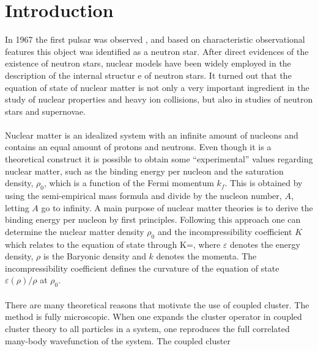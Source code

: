 \chapter{Introduction}
In 1967 the first
pulsar was observed \cite{nat:hewish}, and based on characteristic
observational features this object was identified as a neutron star. After
direct evidences of the existence of neutron stars, nuclear models have been widely
employed in the description of the internal structur e of neutron stars. It 
turned out that the equation of state of nuclear matter is not only a very 
important ingredient in the study of nuclear properties and heavy ion 
collisions, but also in studies of neutron stars and supernovae.\\
\\
Nuclear matter is an idealized system with an infinite amount of nucleons
and contains an equal amount of protons and neutrons. Even though it is a
theoretical construct it is possible to obtain some ``experimental'' values
regarding nuclear matter, such as the binding energy per nucleon and the saturation density, $\rho_0$, which
is a function of the Fermi momentum $k_f$. 
This is obtained by using the semi-empirical mass formula and divide
by the nucleon number, $A$, letting
$A$ go to infinity. A main purpose of nuclear matter theories is to derive the 
binding energy per nucleon by first principles. Following this approach one can determine the nuclear matter density $\rho_0$ and the incompressibility coefficient $K$ which relates to the equation of state through
\beq
K=,
\eeq
where $\varepsilon$ denotes the energy density, $\rho$ is the Baryonic density 
and $k$ denotes the momenta. The incompressibility coefficient defines the 
curvature of the equation of state $\varepsilon(\rho)/\rho$ at $\rho_0$.\\ 
\\
There are many theoretical reasons that motivate the use of coupled cluster. The
method is fully microscopic. When one expands the cluster operator in coupled cluster theory to all particles in a system, one reproduces the full correlated many-body wavefunction of the system.  The coupled cluster 
